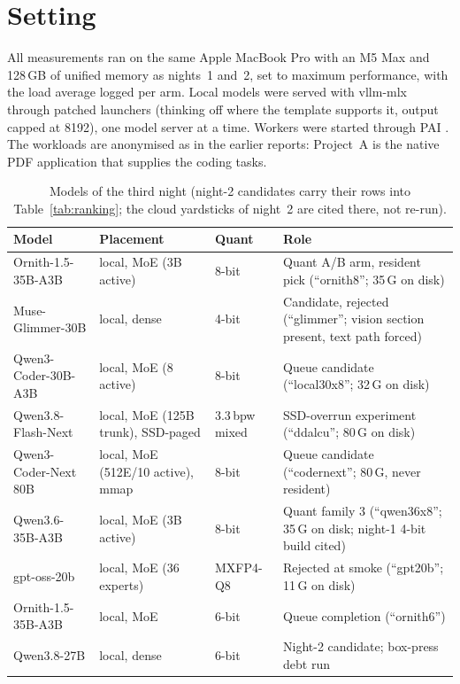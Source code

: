 \section{Setting}\label{sec:setting}

All measurements ran on the same Apple MacBook Pro with an M5 Max and 128\,GB of unified memory as nights~1 and~2,
set to maximum performance, with the load average logged per arm. Local models were served with vllm-mlx
\citep{vllm-mlx-2026aa} through patched launchers (thinking off where the template supports it, output capped at
8192), one model server at a time. Workers were started through PAI \citep{Nott-2026aa}. The workloads are
anonymised as in the earlier reports: Project~A is the native PDF application that supplies the coding tasks.

\begin{table}[htbp]
\centering
\small
\caption{Models of the third night (night-2 candidates carry their rows into Table~\ref{tab:ranking}; the cloud
yardsticks of night~2 are cited there, not re-run).}\label{tab:models3}
\begin{tabular}{P{4.4cm}P{3.2cm}P{1.8cm}P{4.8cm}}
\toprule
Model & Placement & Quant & Role \\
\midrule
Ornith-1.5-35B-A3B & local, MoE (3B active) & 8-bit & Quant A/B arm, resident pick (``ornith8''; 35\,G on disk) \\
Muse-Glimmer-30B & local, dense & 4-bit & Candidate, rejected (``glimmer''; vision section present, text path forced) \\
Qwen3-Coder-30B-A3B \citep{Qwen-Team-2025aa} & local, MoE (8 active) & 8-bit & Queue candidate (``local30x8''; 32\,G on disk) \\
Qwen3.8-Flash-Next & local, MoE (125B trunk), SSD-paged & 3.3\,bpw mixed & SSD-overrun experiment (``ddalcu''; 80\,G on disk) \\
Qwen3-Coder-Next 80B & local, MoE (512E/10 active), mmap & 8-bit & Queue candidate (``codernext''; 80\,G, never resident) \\
Qwen3.6-35B-A3B & local, MoE (3B active) & 8-bit & Quant family 3 (``qwen36x8''; 35\,G on disk; night-1 4-bit build cited) \\
gpt-oss-20b & local, MoE (36 experts) & MXFP4-Q8 & Rejected at smoke (``gpt20b''; 11\,G on disk) \\
Ornith-1.5-35B-A3B & local, MoE & 6-bit & Queue completion (``ornith6'') \\
Qwen3.8-27B & local, dense & 6-bit & Night-2 candidate; box-press debt run \\

\end{tabular}
\end{table}
